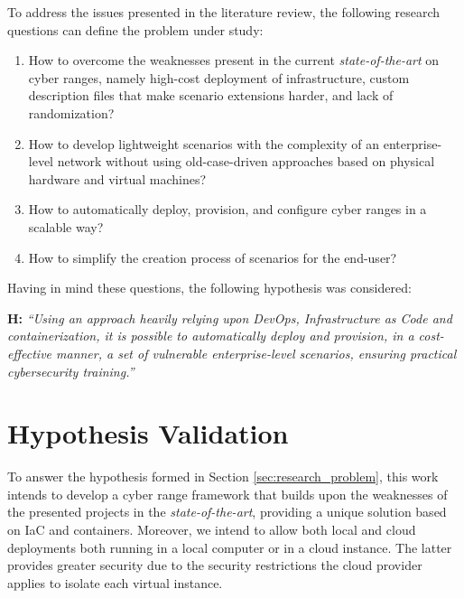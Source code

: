 To address the issues presented in the literature review, the following research questions can define the problem under study:

\begin{enumerate}
    \item How to overcome the weaknesses present in the current \textit{state-of-the-art} on cyber ranges, namely high-cost deployment of infrastructure, custom description files that make scenario extensions harder, and lack of randomization? 
    \item How to develop lightweight scenarios with the complexity of an enterprise-level network without using old-case-driven approaches based on physical hardware and virtual machines?
    \item How to automatically deploy, provision, and configure cyber ranges in a scalable way?
    \item How to simplify the creation process of scenarios for the end-user?
\end{enumerate}

Having in mind these questions, the following hypothesis was considered:\\

\leftskip=1.25cm\rightskip=1.25cm

\textbf{H:} \textit{``Using an approach heavily relying upon DevOps, Infrastructure as Code and containerization, it is possible to automatically deploy and provision, in a cost-effective manner, a set of vulnerable enterprise-level scenarios, ensuring practical cybersecurity training.''}

\leftskip=0cm\rightskip=0cm

\section{Hypothesis Validation} \label{sec:hypothesis_validation}

To answer the hypothesis formed in Section \ref{sec:research_problem}, this work intends to develop a cyber range framework that builds upon the weaknesses of the presented projects in the \textit{state-of-the-art}, providing a unique solution based on IaC and containers. Moreover, we intend to allow both local and cloud deployments both running in a local computer or in a cloud instance. The latter provides greater security due to the security restrictions the cloud provider applies to isolate each virtual instance.  

